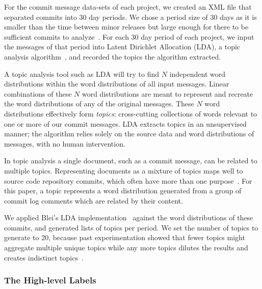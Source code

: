 \documentclass[smallextended]{svjour3}       %
\begin{document}
For the commit message data-sets of each project, we created an XML file that separated commits into 30 day periods. 
We chose a period size of 30 days as it is smaller than the time between minor releases but large enough for there to be sufficient commits to analyze~\cite{Hindle09ICSM}. 
For each 30 day period of each project, we input the messages of that period into Latent Dirichlet Allocation (LDA), a topic analysis algorithm~\cite{Blei2003}, and recorded the topics the algorithm extracted.

A topic analysis tool such as LDA will try to find $N$ independent
word distributions within the word distributions of all input messages. 
Linear combinations of these $N$ word distributions are meant to represent and recreate the word distributions of any of the original messages. 
These $N$ word distributions effectively form \emph{topics}: cross-cutting collections of words relevant to one or more of our commit messages. 
LDA extracts topics in an unsupervised manner; the algorithm relies
solely on the source data and word distributions of messages, with no human intervention.

In topic analysis a single document, such as a commit message, can be related to multiple topics. 
Representing documents as a mixture of topics maps well to source code repository commits, which often have more than one purpose~\cite{Hindle09ICSM}.  
For this paper, a topic represents a word distribution generated from a group of commit log comments which are related by their content.  

We applied Blei's LDA implementation~\cite{Blei2003} against the word distributions of these commits, and generated lists of topics per period. 
We set the number of topics to generate to $20$, because past experimentation showed that fewer topics might aggregate multiple unique topics while any more topics dilutes the results and creates indistinct topics~\cite{Hindle09ICSM}. 

\subsubsection{The High-level Labels}
\end{document}
